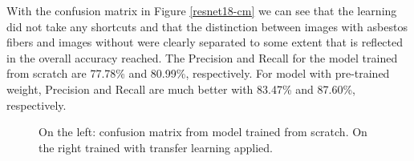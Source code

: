 With the confusion matrix in Figure \ref{resnet18-cm} we can see that the learning did not take any shortcuts and that the distinction between images with asbestos fibers and images without were clearly separated to some extent that is reflected in the overall accuracy reached. The Precision and Recall for the model trained from scratch are 77.78\% and 80.99\%, respectively. For model with pre-trained weight, Precision and Recall are much better with 83.47\% and 87.60\%, respectively.

\begin{figure}[h]
\centering
{}
\caption{On the left: confusion matrix from model trained from scratch. On the right trained with transfer learning applied.}
\label{fig:resnet18-cm}
\end{figure}




















